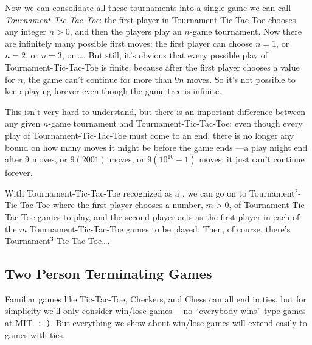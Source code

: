 \begin{definition}
Now we can consolidate all these tournaments into a single game we can call
\emph{Tournament-Tic-Tac-Toe}: the first player in Tournament-Tic-Tac-Toe
chooses any integer $n > 0$, and then the players play an $n$-game
tournament.  Now there are infinitely many possible first moves: the first
player can choose $n=1$, or $n=2$, or $n=3$, or \dots.  But still, it's
obvious that every possible play of Tournament-Tic-Tac-Toe is finite,
because after the first player chooses a value for $n$, the game can't
continue for more than $9n$ moves.  So it's not possible to keep playing
forever even though the game tree is infinite.

This isn't very hard to understand, but there is an important difference
between any given $n$-game tournament and Tournament-Tic-Tac-Toe: even
though every play of Tournament-Tic-Tac-Toe must come to an end, there is
no longer any bound on how many moves it might be before the game ends ---a
play might end after 9 moves, or $9(2001)$ moves, or $9(10^{10}+1)$ moves;
it just can't continue forever.

With Tournament-Tic-Tac-Toe recognized as a \tg, we can go on to
Tournament$^2$-Tic-Tac-Toe where the first player chooses a number, $m>0$,
of Tournament-Tic-Tac-Toe games to play, and the second player acts as the
first player in each of the $m$ Tournament-Tic-Tac-Toe games to be played.
Then, of course, there's Tournament$^3$-Tic-Tac-Toe\dots.

\subsection{Two Person Terminating Games}

Familiar games like Tic-Tac-Toe, Checkers, and Chess can all end in ties,
but for simplicity we'll only consider win/lose games ---no ``everybody
wins''-type games at MIT. \texttt{:-)}.  But everything we show about
win/lose games will extend easily to games with ties.

\end{definition}
